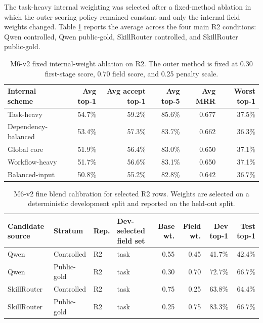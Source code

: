 The task-heavy internal weighting was selected after a fixed-method ablation in which the outer scoring policy remained constant and only the internal field weights changed. Table \ref{tab:m6v2-internal-weight-ablation-v04} reports the average across the four main R2 conditions: Qwen controlled, Qwen public-gold, SkillRouter controlled, and SkillRouter public-gold.

\begin{table}[h]
\centering
\scriptsize
\begin{tabular}{p{}rrrrr}
\toprule
Internal scheme & Avg top-1 & Avg accept top-1 & Avg top-5 & Avg MRR & Worst top-1 \\
\midrule
Task-heavy & 54.7\% & 59.2\% & 85.6\% & 0.677 & 37.5\% \\
Dependency-balanced & 53.4\% & 57.3\% & 83.7\% & 0.662 & 36.3\% \\
Global core & 51.9\% & 56.4\% & 83.0\% & 0.650 & 37.1\% \\
Workflow-heavy & 51.7\% & 56.6\% & 83.1\% & 0.650 & 37.1\% \\
Balanced-input & 50.8\% & 55.2\% & 82.8\% & 0.642 & 36.7\% \\
\bottomrule
\end{tabular}
\caption{M6-v2 fixed internal-weight ablation on R2. The outer method is fixed at 0.30 first-stage score, 0.70 field score, and 0.25 penalty scale.}
\label{tab:m6v2-internal-weight-ablation-v04}
\end{table}

\begin{table}[h]
\centering
\scriptsize
\begin{tabular}{p{}p{}p{}p{}rrrr}
\toprule
Candidate source & Stratum & Rep. & Dev-selected field set & Base wt. & Field wt. & Dev top-1 & Test top-1 \\
\midrule
Qwen & Controlled & R2 & task & 0.55 & 0.45 & 41.7\% & 42.4\% \\
Qwen & Public-gold & R2 & task & 0.30 & 0.70 & 72.7\% & 66.7\% \\
SkillRouter & Controlled & R2 & task & 0.75 & 0.25 & 63.8\% & 64.4\% \\
SkillRouter & Public-gold & R2 & task & 0.25 & 0.75 & 83.3\% & 66.7\% \\
\bottomrule
\end{tabular}
\caption{M6-v2 fine blend calibration for selected R2 rows. Weights are selected on a deterministic development split and reported on the held-out split.}
\label{tab:m6v2-calibration-v04}
\end{table}

